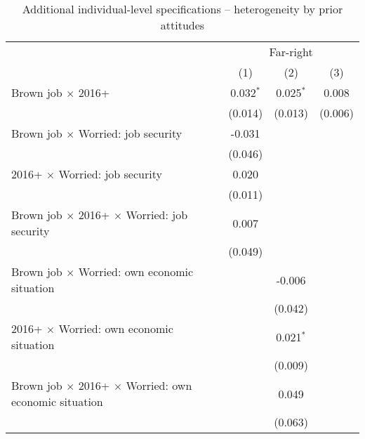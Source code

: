 \begin{table}[htbp]
   \caption{Additional individual-level specifications – heterogeneity by prior attitudes}
   \centering
   \begin{tabular}{lccc}
      \tabularnewline \midrule \midrule
       & \multicolumn{3}{c}{Far-right}\\
                                                                          & (1)         & (2)         & (3)\\  
      Brown job $\times$ 2016+                                            & 0.032$^{*}$ & 0.025$^{*}$ & 0.008\\   
                                                                          & (0.014)     & (0.013)     & (0.006)\\   
      Brown job $\times$ Worried: job security                            & -0.031      &             &   \\   
                                                                          & (0.046)     &             &   \\   
      2016+ $\times$ Worried: job security                                & 0.020       &             &   \\   
                                                                          & (0.011)     &             &   \\   
      Brown job $\times$ 2016+ $\times$ Worried: job security             & 0.007       &             &   \\   
                                                                          & (0.049)     &             &   \\   
      Brown job $\times$ Worried: own economic situation                  &             & -0.006      &   \\   
                                                                          &             & (0.042)     &   \\   
      2016+ $\times$ Worried: own economic situation                      &             & 0.021$^{*}$ &   \\   
                                                                          &             & (0.009)     &   \\   
      Brown job $\times$ 2016+ $\times$ Worried: own economic situation   &             & 0.049       &   \\   
                                                                          &             & (0.063)     &   \\   

\end{tabular}
\end{table}
